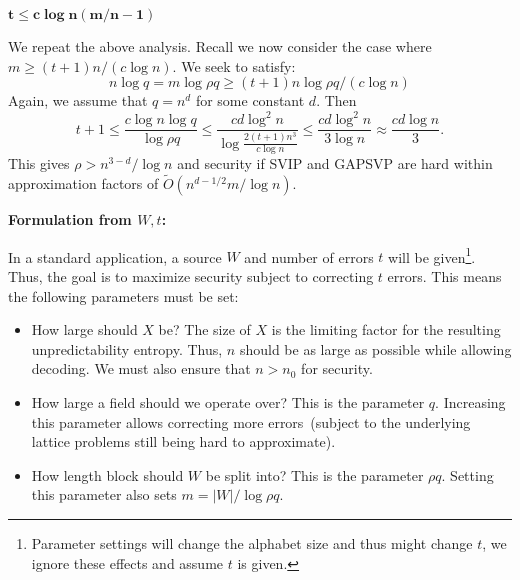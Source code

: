 \documentclass[11pt]{article}
\newcommand{\lemref}[1]{\mbox{Lemma~\ref{#1}}}
\begin{document}
{%

$\mathbf{t\leq c\log n(m/n -1)}$

We repeat the above analysis.  Recall we now consider the case where $m\geq (t+1)n/(c\log n)$.  We seek to satisfy:
\[
n\log q = m\log \rho q \geq (t+1)n \log \rho q /(c\log n)
\]
Again, we assume that $q = n^d$ for some constant $d$.  Then 
\[
t+1\leq \frac{c \log n \log q }{\log \rho q}\leq \frac{cd\log^2 n}{ \log \frac{2(t+1) n^3}{c\log n}}\leq \frac{cd \log^2 n}{3 \log n} \approx \frac{cd \log n}{3}.
\]
This gives $\rho > n^{3-d}/\log n$ and security if SVIP and GAPSVP are hard within approximation factors of $\tilde{O}(n^{d-1/2}m/\log n)$.

\textbf{Formulation from $W, t$:}

In a standard application, a source $W$ and number of errors $t$ will be given\footnote{Parameter settings will change the alphabet size and thus might change $t$, we ignore these effects and assume $t$ is given.}.  Thus, the goal is to maximize security subject to correcting $t$ errors.  This means the following parameters must be set:
\begin{itemize}
\item How large should $X$ be?  The size of $X$ is the limiting factor for the resulting unpredictability entropy.  Thus, $n$ should be as large as possible while allowing decoding.  We must also ensure that $n>n_0$ for security.
\item How large a field should we operate over?  This is the parameter $q$.  Increasing this parameter allows correcting more errors~(subject to the underlying lattice problems still being hard to approximate).
\item How length block should $W$ be split into?  This is the parameter $\rho q$.  Setting this parameter also sets $m = |W|/\log \rho q$.
\end{itemize}

}
\end{document}

